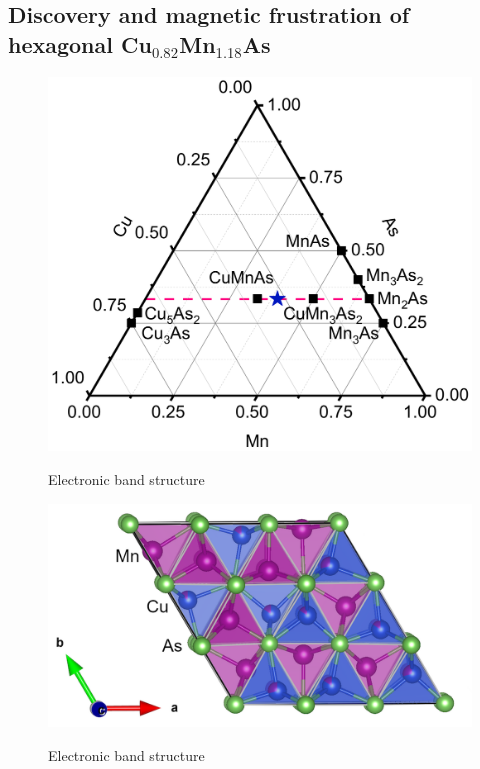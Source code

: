 \documentclass[11pt,edeposit,draftthesis]{uiucthesis2020}
\begin{document}
\begin{mainmatter}
\chapter{Discovery and magnetic frustration of hexagonal Cu$_{0.82}$Mn$_{1.18}$As}

\begin{figure}
\centering\includegraphics[width=\columnwidth]{figures/ch5/phase_diagram_cropped.pdf} \\
\caption{\label{fig:phase_diagram}
Electronic band structure
}
\end{figure}

\begin{figure}
\centering\includegraphics[width=\columnwidth]{figures/ch5/CuMnAs_chemical_structure.png} \\
\caption{\label{fig:chemical_structure}
Electronic band structure
}
\end{figure}


\end{mainmatter}
\end{document}
